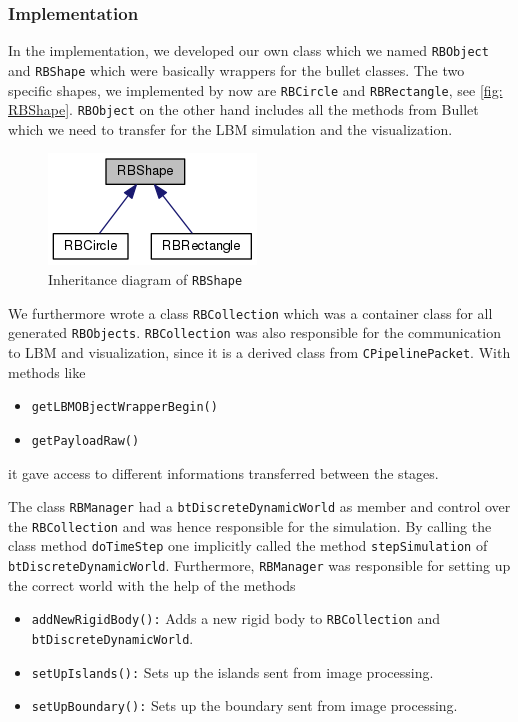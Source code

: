 \subsubsection{Implementation}
In the implementation, we developed our own class which we named \texttt{RBObject} and \texttt{RBShape} which were basically wrappers for the bullet classes. The two specific shapes, we implemented by now are \texttt{RBCircle} and \texttt{RBRectangle}, see \autoref{fig: RBShape}. \texttt{RBObject} on the other hand includes all the methods from Bullet which we need to transfer for the LBM simulation and the visualization. 
\begin{figure}
\centering
\includegraphics[scale=0.2]{img/RigidBodies/RBShapeGraph.png}
\caption{Inheritance diagram of \texttt{RBShape}}
\label{fig: RBShape}
\end{figure}

We furthermore wrote a class \texttt{RBCollection} which was a container class for all generated \texttt{RBObjects}. \texttt{RBCollection} was also responsible for the communication to LBM and visualization, since it is a derived class from \texttt{CPipelinePacket}. With methods like 
\begin{itemize}
\item \texttt{getLBMOBjectWrapperBegin()}
\item \texttt{getPayloadRaw()}
\end{itemize} 
it gave access to different informations transferred between the stages. 


The class \texttt{RBManager} had a \texttt{btDiscreteDynamicWorld} as member and control over the \texttt{RBCollection} and was hence responsible for the simulation. By calling the class method \texttt{doTimeStep} one implicitly called the method \texttt{stepSimulation} of \texttt{btDiscreteDynamicWorld}. Furthermore, \texttt{RBManager} was responsible for setting up the correct world with the help of the methods 
\begin{itemize}
\item \texttt{addNewRigidBody():} Adds a new rigid body to \texttt{RBCollection} and \texttt{btDiscreteDynamicWorld}.
\item \texttt{setUpIslands():} Sets up the islands sent from image processing.
\item \texttt{setUpBoundary():} Sets up the boundary sent from image processing.
\end{itemize}


